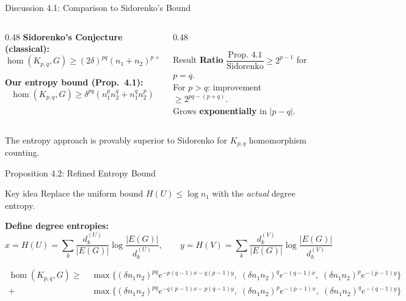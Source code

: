 \documentclass[aspectratio=169]{beamer}
\begin{document}
\begin{frame}{Discussion 4.1: Comparison to Sidorenko's Bound}
  \begin{columns}
    \begin{column}{0.48\textwidth}
      \textbf{Sidorenko's Conjecture (classical):}
      \[
        \hom(K_{p,q}, G) \geq (2\delta)^{pq}(n_1 + n_2)^{p+q-2} \cdots
      \]

      \textbf{Our entropy bound (Prop.\ 4.1):}
      \[
        \hom(K_{p,q}, G) \geq \delta^{pq}(n_1^p n_2^q + n_1^q n_2^p)
      \]
    \end{column}
    \begin{column}{0.48\textwidth}
      \begin{alertblock}{Result}
        \textbf{Ratio} $\dfrac{\text{Prop.\ 4.1}}{\text{Sidorenko}} \geq 2^{p-1}$ for $p = q$.\\[0.4em]
        For $p > q$: improvement $\geq 2^{pq-(p+q)}$.\\[0.3em]
        Grows \textbf{exponentially} in $|p - q|$.
      \end{alertblock}
    \end{column}
  \end{columns}
  \vspace{0.5em}
  The entropy approach is provably superior to Sidorenko for $K_{p,q}$ homomorphism counting.
\end{frame}

\begin{frame}{Proposition 4.2: Refined Entropy Bound}
  \begin{block}{Key idea}
    Replace the uniform bound $H(U) \leq \log n_1$ with the \textit{actual} degree entropy.
  \end{block}

  \textbf{Define degree entropies:}
  \[
    x = H(U) = \sum_k \frac{d_k^{(U)}}{|E(G)|} \log \frac{|E(G)|}{d_k^{(U)}}, \qquad
    y = H(V) = \sum_k \frac{d_k^{(V)}}{|E(G)|} \log \frac{|E(G)|}{d_k^{(V)}}
  \]

  \begin{theorem}[Proposition 4.2]
    \begin{align*}
      \hom(K_{p,q}, G) \geq\;
        &\max\!\bigl\{(\delta n_1 n_2)^{pq} e^{-p(q-1)x - q(p-1)y},\;
          (\delta n_1 n_2)^q e^{-(q-1)x},\;
          (\delta n_1 n_2)^p e^{-(p-1)y}\bigr\}\\
        +\;&\max\!\bigl\{(\delta n_1 n_2)^{pq} e^{-q(p-1)x - p(q-1)y},\;
          (\delta n_1 n_2)^p e^{-(p-1)x},\;
          (\delta n_1 n_2)^q e^{-(q-1)y}\bigr\}
    \end{align*}
  \end{theorem}
\end{frame}
\end{document}
